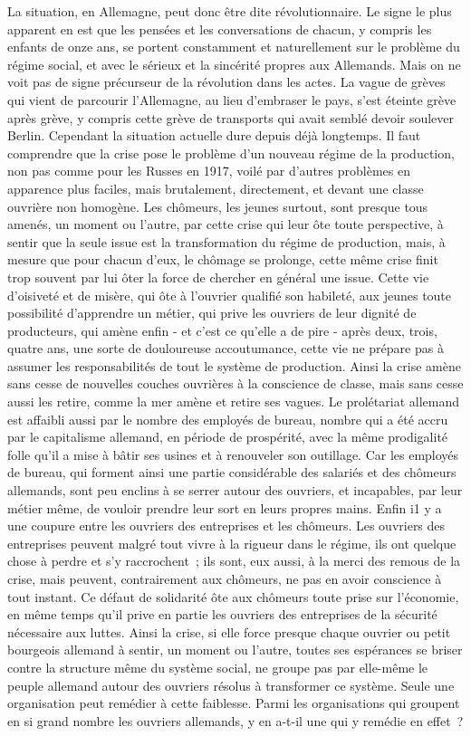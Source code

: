 \documentclass[french,twoside]{book} %
\begin{document}
La situation, en Allemagne, peut donc être dite révolutionnaire. Le signe le plus apparent en est que les pensées et les conversations de chacun, y compris les enfants de onze ans, se portent constamment et naturellement sur le pro­blème du régime social, et avec le sérieux et la sincérité propres aux Alle­mands. Mais on ne voit pas de signe précurseur de la révolution dans les actes. La vague de grèves qui vient de parcourir l'Allemagne, au lieu d'embraser le pays, s'est éteinte grève après grève, y compris cette grève de transports qui avait semblé devoir soulever Berlin. Cependant la situation actuelle dure depuis déjà longtemps. Il faut comprendre que la crise pose le problème d'un nouveau régime de la production, non pas comme pour les Russes en 1917, voilé par d'autres problèmes en apparence plus faciles, mais brutalement, directement, et devant une classe ouvrière non homogène. Les chômeurs, les jeunes surtout, sont presque tous amenés, un moment ou l'autre, par cette crise qui leur ôte toute perspective, à sentir que la seule issue est la transformation du régime de production, mais, à mesure que pour chacun d'eux, le chômage se prolonge, cette même crise finit trop souvent par lui ôter la force de chercher en général une issue. Cette vie d'oisiveté et de misère, qui ôte à l'ouvrier qualifié son habileté, aux jeunes toute possibilité d'apprendre un métier, qui prive les ouvriers de leur dignité de producteurs, qui amène enfin - et c'est ce qu'elle a de pire - après deux, trois, quatre ans, une sorte de doulou­reuse accoutumance, cette vie ne prépare pas à assumer les responsabilités de tout le système de production. Ainsi la crise amène sans cesse de nouvelles couches ouvrières à la conscience de classe, mais sans cesse aussi les retire, comme la mer amène et retire ses vagues. Le prolétariat allemand est affaibli aussi par le nombre des employés de bureau, nombre qui a été accru par le capitalisme allemand, en période de prospérité, avec la même prodigalité folle qu'il a mise à bâtir ses usines et à renouveler son outillage. Car les employés de bureau, qui forment ainsi une partie considérable des salariés et des chômeurs allemands, sont peu enclins à se serrer autour des ouvriers, et incapables, par leur métier même, de vouloir prendre leur sort en leurs propres mains. Enfin i1 y a une coupure entre les ouvriers des entreprises et les chômeurs. Les ouvriers des entreprises peuvent malgré tout vivre à la rigueur dans le régime, ils ont quelque chose à perdre et s'y raccrochent ; ils sont, eux aussi, à la merci des remous de la crise, mais peuvent, contrairement aux chômeurs, ne pas en avoir conscience à tout instant. Ce défaut de solidarité ôte aux chômeurs toute prise sur l'économie, en même temps qu'il prive en partie les ouvriers des entreprises de la sécurité nécessaire aux luttes. Ainsi la crise, si elle force presque chaque ouvrier ou petit bourgeois allemand à sentir, un moment ou l'autre, toutes ses espérances se briser contre la structure même du système social, ne groupe pas par elle-même le peuple allemand autour des ouvriers résolus à transformer ce système. Seule une organisation peut remé­dier à cette faiblesse. Parmi les organisations qui groupent en si grand nombre les ouvriers allemands, y en a-t-il une qui y remédie en effet ?\par
\end{document}
